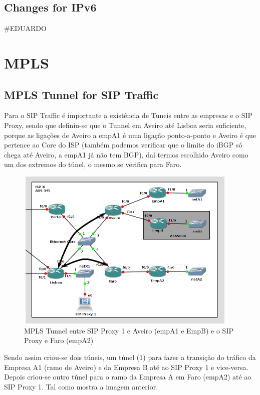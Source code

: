 \documentclass[11pt,a4paper]{report}
\begin{document}
\section{Changes for IPv6}
\#EDUARDO

\chapter{MPLS}

\section{MPLS Tunnel for SIP Traffic}

Para o SIP Traffic é importante a existência de Tuneis entre as empresas e o SIP Proxy, sendo que definiu-se que o Tunnel em Aveiro até Lisboa seria suficiente, porque as ligações de Aveiro a empA1 é uma ligação ponto-a-ponto e Aveiro é que pertence ao Core do ISP (também podemos verificar que o limite do iBGP só chega até Aveiro, a empA1 já não tem BGP), daí termos escolhido Aveiro como um dos extremos do túnel, o mesmo se verifica para Faro.\\

\begin{figure}[H]
\centerline{\includegraphics[width=300pt]{network_tunnel.png}}
\caption{MPLS Tunnel entre SIP Proxy 1 e Aveiro (empA1 e EmpB) e o SIP Proxy e Faro (empA2)}
\label{schema}
\end{figure}


Sendo assim criou-se dois túneis, um túnel (1) para fazer a transição do tráfico da Empresa A1 (ramo de Aveiro) e da Empresa B até ao SIP Proxy 1 e vice-versa. Depois criou-se outro túnel para o ramo da Empresa A em Faro (empA2) até ao SIP Proxy 1. Tal como mostra a imagem anterior.\\
\end{document}
